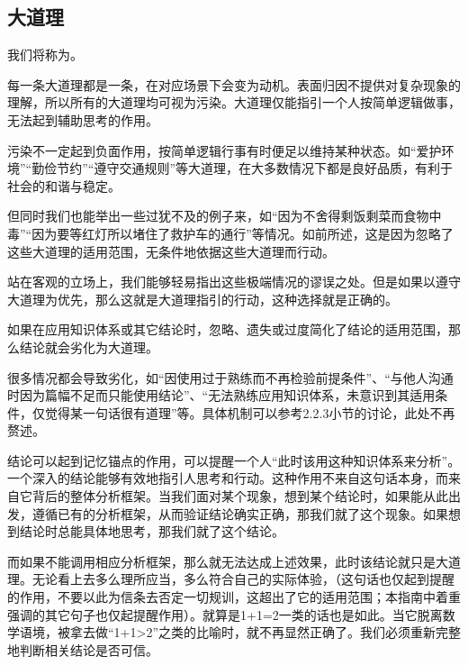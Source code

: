 \subsection{大道理}
我们将称为。
\begin{examples}
每一条大道理都是一条，在对应场景下会变为动机。表面归因不提供对复杂现象的理解，所以所有的大道理均可视为污染。大道理仅能指引一个人按简单逻辑做事，无法起到辅助思考的作用。

污染不一定起到负面作用，按简单逻辑行事有时便足以维持某种状态。如“爱护环境”“勤俭节约”“遵守交通规则”等大道理，在大多数情况下都是良好品质，有利于社会的和谐与稳定。

但同时我们也能举出一些过犹不及的例子来，如“因为不舍得剩饭剩菜而食物中毒”“因为要等红灯所以堵住了救护车的通行”等情况。如前所述，这是因为忽略了这些大道理的适用范围，无条件地依据这些大道理而行动。

站在客观的立场上，我们能够轻易指出这些极端情况的谬误之处。但是如果以遵守大道理为优先，那么这就是大道理指引的行动，这种选择就是正确的。
\end{examples}
如果在应用知识体系或其它结论时，忽略、遗失或过度简化了结论的适用范围，那么结论就会劣化为大道理。
\begin{examples}
很多情况都会导致劣化，如“因使用过于熟练而不再检验前提条件”、“与他人沟通时因为篇幅不足而只能使用结论”、“无法熟练应用知识体系，未意识到其适用条件，仅觉得某一句话很有道理”等。具体机制可以参考2.2.3小节的讨论，此处不再赘述。

结论可以起到记忆锚点的作用，可以提醒一个人“此时该用这种知识体系来分析”。一个深入的结论能够有效地指引人思考和行动。这种作用不来自这句话本身，而来自它背后的整体分析框架。当我们面对某个现象，想到某个结论时，如果能从此出发，遵循已有的分析框架，从而验证结论确实正确，那我们就了这个现象。如果想到结论时总能具体地思考，那我们就了这个结论。

而如果不能调用相应分析框架，那么就无法达成上述效果，此时该结论就只是大道理。无论看上去多么理所应当，多么符合自己的实际体验，（这句话也仅起到提醒的作用，不要以此为信条去否定一切规训，这超出了它的适用范围；本指南中着重强调的其它句子也仅起提醒作用）。就算是1+1=2一类的话也是如此。当它脱离数学语境，被拿去做“1+1>2”之类的比喻时，就不再显然正确了。我们必须重新完整地判断相关结论是否可信。
\end{examples}

